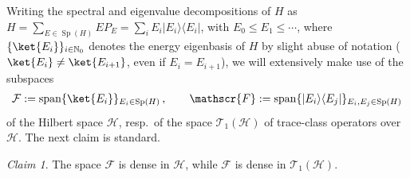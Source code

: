 \documentclass[11pt]{amsart}
\newcommand{\1}{\mathbbm{1}}
\theoremstyle{plain}
\theoremstyle{definition}
\theoremstyle{remark}
\newtheorem{claim}{Claim}[theorem]
\numberwithin{equation}{section}
\begin{document}
\noindent Writing the spectral and eigenvalue decompositions of $H$ as $H=\sum_{E\in\operatorname{Sp}(H)}EP_E=\sum_{i}E_i|E_i\rangle\langle E_i|$, with $E_0\le E_1\le \cdots $, where $\{\ket{E_i}\}_{i\in\mathbb{N}_0}$ denotes the energy eigenbasis of $H$ by slight abuse of notation ($\ket{E_i}\ne \ket{E_{i+1}}$, even if $E_i=E_{i+1}$), we will extensively make use of the subspaces
\begin{align*}
\mathcal{F}:=\operatorname{span}\{\ket{E_i}\}_{E_i\in\operatorname{Sp}(H)}\,,\qquad \mathscr{F}:=\operatorname{span}\{|E_i\rangle\langle E_j|\}_{E_i,E_j\in\operatorname{Sp}(H)} 
\end{align*}
of the Hilbert space $\mathcal{H}$, resp.~of the space $\mathscr{T}_1(\mathcal{H})$ of trace-class operators over $\mathcal{H}$. The next claim is standard. 
\begin{claim}\label{densityFFs}
The space $\mathcal{F}$ is dense in $\mathcal{H}$, while $\mathscr{F}$ is dense in $\mathscr{T}_1(\mathcal{H})$.
\end{claim} 
\end{document}
